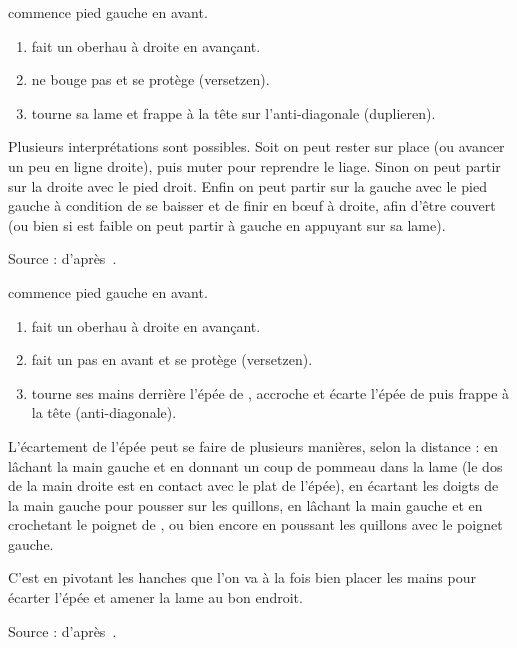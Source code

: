 \begin{technique}
\label{épée-longue:tech:dg-fechten-duplieren}

\A commence pied gauche en avant.

\begin{enumerate}
	\item \A fait un oberhau à droite en avançant.
	\item \D ne bouge pas et se protège (versetzen).
	\item \A tourne sa lame et frappe à la tête sur l'anti-diagonale (duplieren).
\end{enumerate}

Plusieurs interprétations sont possibles.
Soit on peut rester sur place (ou avancer un peu en ligne droite), puis muter pour reprendre le liage.
Sinon on peut partir sur la droite avec le pied droit.
Enfin on peut partir sur la gauche avec le pied gauche à condition de se baisser et de finir en bœuf à droite, afin d'être couvert (ou bien si \D est faible on peut partir à gauche en appuyant sur sa lame).

Source : d'après~\cite{kronenburg:dijon:going_distance:2015}.

\end{technique}


\begin{technique}
\label{épée-longue:tech:dg-kriegen-absetzen}

\A commence pied gauche en avant.

\begin{enumerate}
	\item \A fait un oberhau à droite en avançant.
	\item \D fait un pas en avant et se protège (versetzen).
	\item \A tourne ses mains derrière l'épée de \D, accroche et écarte l'épée de \D puis frappe à la tête (anti-diagonale).
\end{enumerate}

L'écartement de l'épée peut se faire de plusieurs manières, selon la distance : en lâchant la main gauche et en donnant un coup de pommeau dans la lame (le dos de la main droite est en contact avec le plat de l'épée), en écartant les doigts de la main gauche pour pousser sur les quillons, en lâchant la main gauche et en crochetant le poignet de \D, ou bien encore en poussant les quillons avec le poignet gauche.

C'est en pivotant les hanches que l'on va à la fois bien placer les mains pour écarter l'épée et amener la lame au bon endroit.

Source : d'après~\cite{kronenburg:dijon:going_distance:2015}.

\end{technique}


